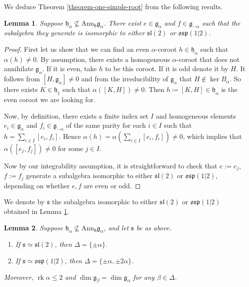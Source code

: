 \documentclass[12pt, a4paper, reqno]{amsart}
\def\p{\mathfrak{p}}
\def\h{\mathfrak{h}}
\def\l{\mathfrak{l}}
\def\s{\mathfrak{s}}
\def\o{\mathfrak{o}}
\def\ol{\overline}
\def\rk{\operatorname{rk}}
\newtheorem{lemma}{Lemma}
\theoremstyle{definition}
\theoremstyle{definition}
\theoremstyle{definition}
\numberwithin{theorem}{section}
\numberwithin{lemma}{section}
\numberwithin{remark}{section}
\numberwithin{definition}{section}
\numberwithin{corollary}{section}
\numberwithin{proposition}{section}
\numberwithin{example}{section}
\begin{document}
	We deduce Theorem \ref{theorem-one-simple-root} from the following results. 
	\begin{lemma}\label{lemma-root-subalgebra}
		Suppose \(\h_{\alpha} \nsubseteq \mathrm{Ann}_{\mathfrak{h}}\mathfrak{g}_{\alpha}\). There exist \(e \in \mathfrak{g}_{\alpha}\) and \(f \in \mathfrak{g}_{-\alpha}\) such that the subalgebra they generate is isomorphic to either \(\s\l(2)\) or \(\mathfrak{osp}(1|2)\).
	\end{lemma}
	\begin{proof}
		First let us show that we can find an even \(\alpha\)-coroot \(h \in \h_{\alpha}\) such that \(\alpha(h) \neq 0\). By assumption, there exists a homogeneous \(\alpha\)-coroot that does not annihilate \(\mathfrak{g}_{\alpha}\). If it is even, take \(h\) to be this coroot. If it is odd denote it by \(H\). It follows from \([H,\mathfrak{g}_{\alpha}]\neq 0\) and from the irreducibility of \(\mathfrak{g}_{\alpha}\) that \(H \notin \ker B_\alpha\). So there exists \(K \in \mathfrak{h}_{\ol{1}}\) such that \(\alpha([K,H]) \neq 0\). Then \(h \coloneq [K,H] \in \mathfrak{h}_{\alpha}\) is the even coroot we are looking for. \par
		Now, by definition, there exists a finite index set \(I\) and homogeneous elements \(e_i \in \mathfrak{g}_{\alpha}\) and \(f_i \in \mathfrak{g}_{-\alpha}\) of the same parity for each \(i\in I\) such that \(h = \sum_{i\in I} [e_i,f_i]\). Hence \(\alpha(h) = \alpha(\sum_{i\in I} [e_i,f_i]) \neq 0\), which implies that \(\alpha([e_j,f_j]) \neq 0\) for some \(j \in I\). 
		
		Now by our integrability assumption, it is straightforward to check that $e:=e_j$, $f:=f_j$ generate a subalgebra isomorphic to either $\s\l(2)$ or $\o\s\p(1|2)$, depending on whether $e,f$ are even or odd.  
	\end{proof}
	We denote by \(\mathfrak{s}\) the subalgebra isomorphic to either $\s\l(2)$ or $\o\s\p(1|2)$ obtained in Lemma \ref{lemma-root-subalgebra}.
	\begin{lemma}\label{lemma-sl2-osp2-subalgebras}
		Suppose \(\h_{\alpha}\nsubseteq \mathrm{Ann}_{\mathfrak{h}}\mathfrak{g}_{\alpha}\), and let \(\mathfrak{s}\) be as above. 
		\begin{enumerate}[label=(\roman*)]
			\item If \(\mathfrak{s} \simeq \s\l(2)\), then \(\Delta = \{\pm \alpha\}\).
			\item If \(\mathfrak{s}\simeq \mathfrak{osp}(1|2)\), then \(\Delta = \{\pm \alpha,\pm 2\alpha\}\).
		\end{enumerate}
		Moreover, \(\rk\alpha \leq 2\) and \(\dim \mathfrak{g}_\beta = \dim \mathfrak{g}_{\alpha}\) for any \(\beta \in \Delta\). 
	\end{lemma}
\end{document}
